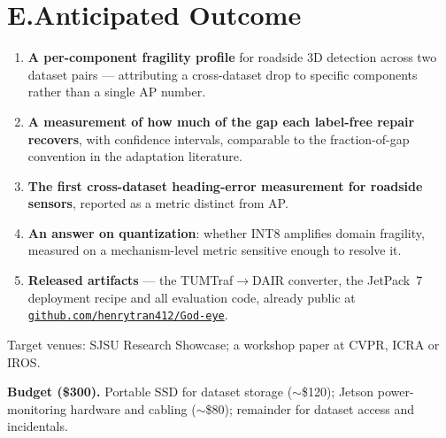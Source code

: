 \documentclass[10pt,letterpaper]{article}
\newcommand{\too}{\ensuremath{\rightarrow}}
\begin{document}
\section{E.\quad Anticipated Outcome}

\begin{enumerate}
\item \textbf{A per-component fragility profile} for roadside 3D detection across two dataset
      pairs --- attributing a cross-dataset drop to specific components rather than a single
      AP number.
\item \textbf{A measurement of how much of the gap each label-free repair recovers}, with
      confidence intervals, comparable to the fraction-of-gap convention in the adaptation
      literature.
\item \textbf{The first cross-dataset heading-error measurement for roadside sensors},
      reported as a metric distinct from AP.
\item \textbf{An answer on quantization}: whether INT8 amplifies domain fragility, measured on
      a mechanism-level metric sensitive enough to resolve it.
\item \textbf{Released artifacts} --- the TUMTraf\too DAIR converter, the JetPack~7 deployment
      recipe and all evaluation code, already public at
      \href{https://github.com/henrytran412/God-eye}{\texttt{github.com/henrytran412/God-eye}}.
\end{enumerate}

Target venues: SJSU Research Showcase; a workshop paper at CVPR, ICRA or IROS.

\textbf{Budget (\$300).} Portable SSD for dataset storage ($\sim$\$120); Jetson
power-monitoring hardware and cabling ($\sim$\$80); remainder for dataset access and
incidentals.
\end{document}
